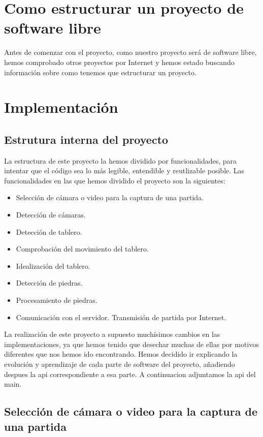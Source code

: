 \documentclass[12pt,a4paper]{report}
\begin{document}
\chapter{Como estructurar un proyecto de software libre}

Antes de comenzar con el proyecto, como nuestro proyecto será de software libre,
hemos comprobado otros proyectos por Internet y hemos estado buscando
información sobre como tenemos que estructurar un proyecto. 



\chapter{Implementación}

\section{Estrutura interna del proyecto}

La estructura de este proyecto la hemos dividido por funcionalidades, para
intentar que el código sea lo más legible, entendible y reutlizable posible. Las
funcionalidades en las que hemos dividido el proyecto son la siguientes:
\begin{itemize} 
    \item Selección de cámara o video para la captura de una partida.
    \item Detección de cámaras. 
    \item Detección de tablero.
    \item Comprobación del movimiento del tablero.
    \item Idealización del tablero.
    \item Detección de piedras.
    \item Procesamiento de piedras. 
    \item Comunicación con el servidor. Transmisión de partida por Internet.
\end{itemize}

La realización de este proyecto a supuesto muchísimos cambios en las
implementaciones, ya que hemos tenido que desechar muchas de ellas por motivos
diferentes que nos hemos ido encontrando. Hemos decidido ir explicando la
evolución y aprendizaje de cada parte de software del proyecto, añadiendo
despues la api correspondiente a esa parte. A continuacion adjuntamos la api del
main.



\section{Selección de cámara o video para la captura de una partida} 
\end{document}
